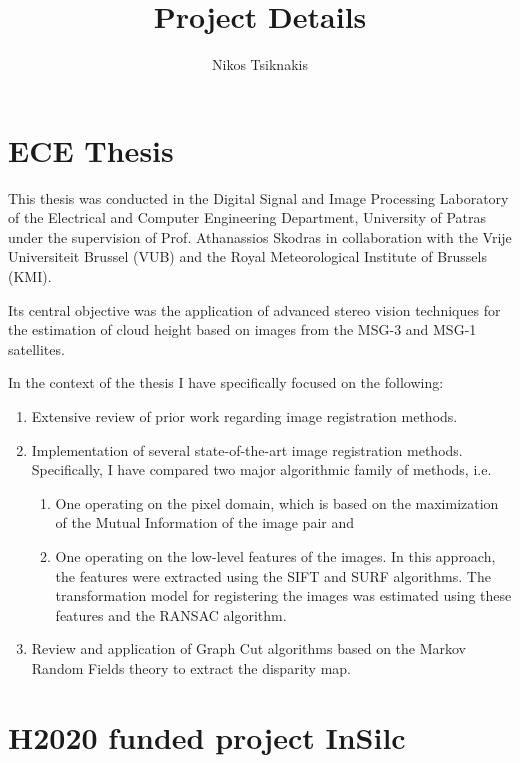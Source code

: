 \documentclass{article}
\begin{document}
\title{Project Details}
\author{Nikos Tsiknakis}

\maketitle

\section{ECE Thesis}
This thesis was conducted in the Digital Signal and Image Processing Laboratory of the Electrical and Computer Engineering Department, University of Patras under the supervision of Prof. Athanassios Skodras in collaboration with the Vrije Universiteit Brussel (VUB) and the Royal Meteorological Institute of Brussels (KMI). \vspace{4pt}

Its central objective was the application of advanced stereo vision techniques for the estimation of cloud height based on images from the MSG-3 and MSG-1 satellites. \vspace{4pt}

In the context of the thesis I have specifically focused on the following:
\begin{enumerate}
    \item Extensive review of prior work regarding image registration methods.
    \item Implementation of several state-of-the-art image registration methods. Specifically, I have compared two major algorithmic family of methods, i.e.
    \begin{enumerate}
        \item One operating on the pixel domain, which is based on the maximization of the Mutual Information of the image pair and
        \item One operating on the low-level features of the images. In this approach, the features were extracted using the SIFT and SURF algorithms. The transformation model for registering the images was estimated using these features and the RANSAC algorithm.
    \end{enumerate}
    \item  Review and application of Graph Cut algorithms based on the Markov Random Fields theory to extract the disparity map.
\end{enumerate}

\section{H2020 funded project InSilc}
\end{document}
